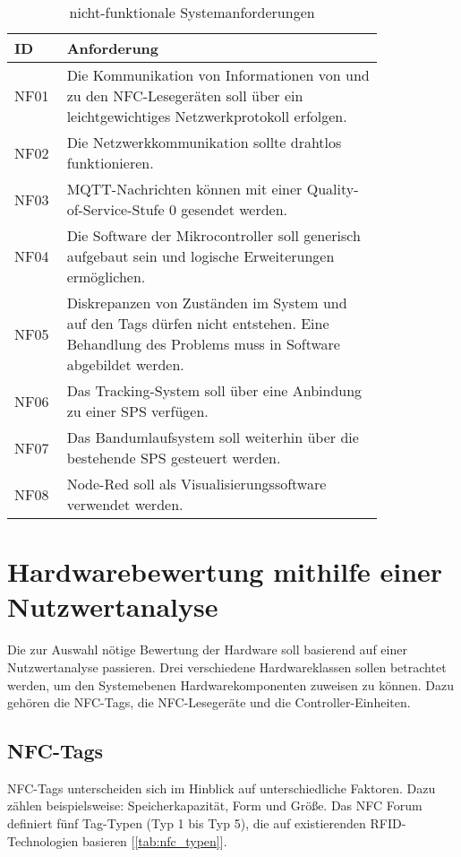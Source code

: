 \begin{table}[H]
	\centering
	\caption{nicht-funktionale Systemanforderungen}
	\label{tab:nf_anforderungen}
	\begin{tabular}{|p{0.075\linewidth}|p{0.75\linewidth}|}
		\hline
		\textbf{ID} & \textbf{Anforderung} \\ \hline

		NF01 & Die Kommunikation von Informationen von und zu den NFC-Lesegeräten soll über ein leichtgewichtiges Netzwerkprotokoll erfolgen. \\ \hline
		NF02 & Die Netzwerkkommunikation sollte drahtlos funktionieren. \\ \hline
		NF03 & MQTT-Nachrichten können mit einer Quality-of-Service-Stufe 0 gesendet werden. \\ \hline
		NF04 & Die Software der Mikrocontroller soll generisch aufgebaut sein und logische Erweiterungen ermöglichen. \\ \hline
		NF05 & Diskrepanzen von Zuständen im System und auf den Tags dürfen nicht entstehen. Eine Behandlung des Problems muss in Software abgebildet werden. \\ \hline
		NF06 & Das Tracking-System soll über eine Anbindung zu einer SPS verfügen. \\ \hline
		NF07 & Das Bandumlaufsystem soll weiterhin über die bestehende SPS gesteuert werden. \\ \hline
		NF08 & Node-Red soll als Visualisierungssoftware verwendet werden. \\ \hline
	\end{tabular}
\end{table}



\section{Hardwarebewertung mithilfe einer Nutzwertanalyse}
\label{sec:hardwarebewertung}
Die zur Auswahl nötige Bewertung der Hardware soll basierend auf einer Nutzwertanalyse passieren. Drei verschiedene Hardwareklassen sollen betrachtet werden, um den Systemebenen Hardwarekomponenten zuweisen zu können. Dazu gehören die NFC-Tags, die NFC-Lesegeräte und die Controller-Einheiten. 

\subsection{NFC-Tags}
NFC-Tags unterscheiden sich im Hinblick auf unterschiedliche Faktoren. Dazu zählen beispielsweise: Speicherkapazität,  Form und Größe. Das NFC Forum definiert fünf Tag-Typen (Typ 1 bis Typ 5), die auf existierenden RFID-Technologien basieren [\autoref{tab:nfc_typen}]. 

